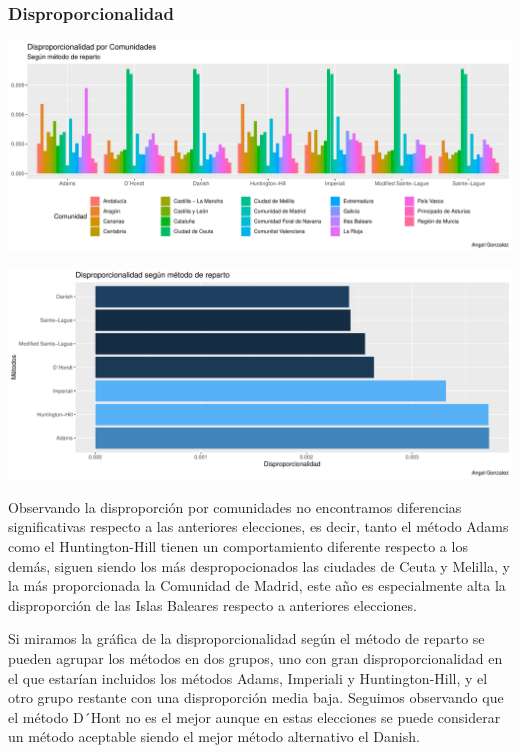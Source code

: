 \documentclass[12pt,a4paper,]{book}
\numberwithin{dummy}{section}
\theoremstyle{ocrenumbox}
\theoremstyle{blacknumex}
\theoremstyle{blacknumbox}
\theoremstyle{ocrenum}
\theoremstyle{ocrenum}
\begin{document}
\hypertarget{disproporcionalidad-6}{%
\subsubsection{Disproporcionalidad}\label{disproporcionalidad-6}}

\begin{center}\includegraphics[width=0.95\linewidth]{figurasR/unnamed-chunk-123-1} \end{center}

\begin{center}\includegraphics[width=0.95\linewidth]{figurasR/unnamed-chunk-123-2} \end{center}

Observando la disproporción por comunidades no encontramos diferencias
significativas respecto a las anteriores elecciones, es decir, tanto el
método Adams como el Huntington-Hill tienen un comportamiento diferente
respecto a los demás, siguen siendo los más despropocionados las
ciudades de Ceuta y Melilla, y la más proporcionada la Comunidad de
Madrid, este año es especialmente alta la disproporción de las Islas
Baleares respecto a anteriores elecciones.

Si miramos la gráfica de la disproporcionalidad según el método de
reparto se pueden agrupar los métodos en dos grupos, uno con gran
disproporcionalidad en el que estarían incluidos los métodos Adams,
Imperiali y Huntington-Hill, y el otro grupo restante con una
disproporción media baja. Seguimos observando que el método D´Hont no es
el mejor aunque en estas elecciones se puede considerar un método
aceptable siendo el mejor método alternativo el Danish.
\end{document}
